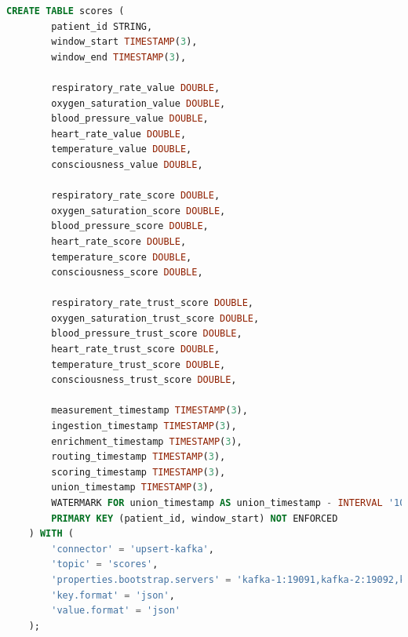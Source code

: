 \newpage

\begin{lstlisting}[language=sql]
    CREATE TABLE scores (
        patient_id STRING,
        window_start TIMESTAMP(3),
        window_end TIMESTAMP(3),

        respiratory_rate_value DOUBLE,
        oxygen_saturation_value DOUBLE,
        blood_pressure_value DOUBLE,
        heart_rate_value DOUBLE,
        temperature_value DOUBLE,
        consciousness_value DOUBLE,

        respiratory_rate_score DOUBLE,
        oxygen_saturation_score DOUBLE,
        blood_pressure_score DOUBLE,
        heart_rate_score DOUBLE,
        temperature_score DOUBLE,
        consciousness_score DOUBLE,

        respiratory_rate_trust_score DOUBLE,
        oxygen_saturation_trust_score DOUBLE,
        blood_pressure_trust_score DOUBLE,
        heart_rate_trust_score DOUBLE,
        temperature_trust_score DOUBLE,
        consciousness_trust_score DOUBLE,

        measurement_timestamp TIMESTAMP(3),
        ingestion_timestamp TIMESTAMP(3),
        enrichment_timestamp TIMESTAMP(3),
        routing_timestamp TIMESTAMP(3),
        scoring_timestamp TIMESTAMP(3),
        union_timestamp TIMESTAMP(3),
        WATERMARK FOR union_timestamp AS union_timestamp - INTERVAL '10' SECONDS,
        PRIMARY KEY (patient_id, window_start) NOT ENFORCED
    ) WITH (
        'connector' = 'upsert-kafka',
        'topic' = 'scores',
        'properties.bootstrap.servers' = 'kafka-1:19091,kafka-2:19092,kafka-3:19093',
        'key.format' = 'json',
        'value.format' = 'json'
    );
\end{lstlisting}

\newpage

